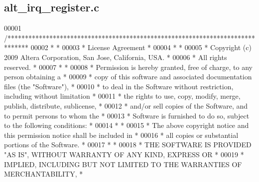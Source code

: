 \subsection{alt\+\_\+irq\+\_\+register.\+c}
\label{alt__irq__register_8c_source}

\begin{DoxyCode}
00001 \textcolor{comment}{/******************************************************************************}
00002 \textcolor{comment}{*                                                                             *}
00003 \textcolor{comment}{* License Agreement                                                           *}
00004 \textcolor{comment}{*                                                                             *}
00005 \textcolor{comment}{* Copyright (c) 2009      Altera Corporation, San Jose, California, USA.      *}
00006 \textcolor{comment}{* All rights reserved.                                                        *}
00007 \textcolor{comment}{*                                                                             *}
00008 \textcolor{comment}{* Permission is hereby granted, free of charge, to any person obtaining a     *}
00009 \textcolor{comment}{* copy of this software and associated documentation files (the "Software"),  *}
00010 \textcolor{comment}{* to deal in the Software without restriction, including without limitation   *}
00011 \textcolor{comment}{* the rights to use, copy, modify, merge, publish, distribute, sublicense,    *}
00012 \textcolor{comment}{* and/or sell copies of the Software, and to permit persons to whom the       *}
00013 \textcolor{comment}{* Software is furnished to do so, subject to the following conditions:        *}
00014 \textcolor{comment}{*                                                                             *}
00015 \textcolor{comment}{* The above copyright notice and this permission notice shall be included in  *}
00016 \textcolor{comment}{* all copies or substantial portions of the Software.                         *}
00017 \textcolor{comment}{*                                                                             *}
00018 \textcolor{comment}{* THE SOFTWARE IS PROVIDED "AS IS", WITHOUT WARRANTY OF ANY KIND, EXPRESS OR  *}
00019 \textcolor{comment}{* IMPLIED, INCLUDING BUT NOT LIMITED TO THE WARRANTIES OF MERCHANTABILITY,    *}

\end{DoxyCode}
